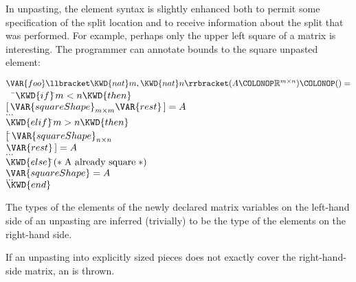 In unpasting, the element syntax is slightly enhanced both to
permit some specification of the split location and to
receive information about the split that was performed.  For
example, perhaps only the upper left square of a matrix is
interesting.  The programmer can annotate bounds to the
square unpasted element:
\begin{Fortress}
\(\VAR{foo}\llbracket\KWD{nat} m, \KWD{nat} n\rrbracket(A\COLONOP\mathbb{R}^{m \times n})\COLONOP() =\)\\
{\tt~~}\pushtabs\=\+\(  \KWD{if}   \null\)\pushtabs\=\+\(m < n \KWD{then}\)\\
\(       [\,\VAR{squareShape}_{m \times m} \VAR{rest}\,] = A\)\\
\(       \ldots\)\-\\\poptabs
\(  \KWD{elif} \null\)\pushtabs\=\+\(m > n \KWD{then}\)\\
\(       [\,\null\)\pushtabs\=\+\(\VAR{squareShape}_{n \times n}\)\\
\(         \VAR{rest}                    \,] = A\)\-\\\poptabs
\(       \ldots\)\-\\\poptabs
\(  \KWD{else} \null\)\pushtabs\=\+\(\mathtt{(*}\;\hbox{\rm  A already square \unskip}\;\mathtt{*)}\)\\
\(       \VAR{squareShape} = A\)\\
\(       \ldots\)\-\\\poptabs
\(  \KWD{end}\)\-\\\poptabs
\end{Fortress}
The types of the elements of the newly declared matrix variables on the left-hand side
of an unpasting are inferred (trivially) to be the type of the elements on the right-hand side.

If an unpasting into explicitly sized pieces does not
exactly cover the right-hand-side matrix, an 
is thrown.

